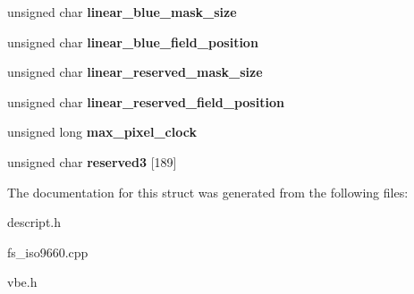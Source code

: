 \begin{DoxyCompactItemize}
\mbox{\label{struct____attribute_____ad9abe83accec50853e5c01764142cdb5}} 
unsigned char {\bfseries linear\+\_\+blue\+\_\+mask\+\_\+size}
\item 
\mbox{\label{struct____attribute_____ab72f2447f05e7eb1ff9b13250be126ec}} 
unsigned char {\bfseries linear\+\_\+blue\+\_\+field\+\_\+position}
\item 
\mbox{\label{struct____attribute_____a5f485968f440cf9df0b86511317e570f}} 
unsigned char {\bfseries linear\+\_\+reserved\+\_\+mask\+\_\+size}
\item 
\mbox{\label{struct____attribute_____ae825c73facd5469d9ee5a3ff0e9774c7}} 
unsigned char {\bfseries linear\+\_\+reserved\+\_\+field\+\_\+position}
\item 
\mbox{\label{struct____attribute_____ae544aca1a10c3aa601e05466aaed003d}} 
unsigned long {\bfseries max\+\_\+pixel\+\_\+clock}
\item 
\mbox{\label{struct____attribute_____a4a8d434003904c06b9c37c4c5b5cc06d}} 
unsigned char {\bfseries reserved3} \mbox{[}189\mbox{]}
\end{DoxyCompactItemize}


The documentation for this struct was generated from the following files\+:\begin{DoxyCompactItemize}
\item 
descript.\+h\item 
fs\+\_\+iso9660.\+cpp\item 
vbe.\+h\end{DoxyCompactItemize}

